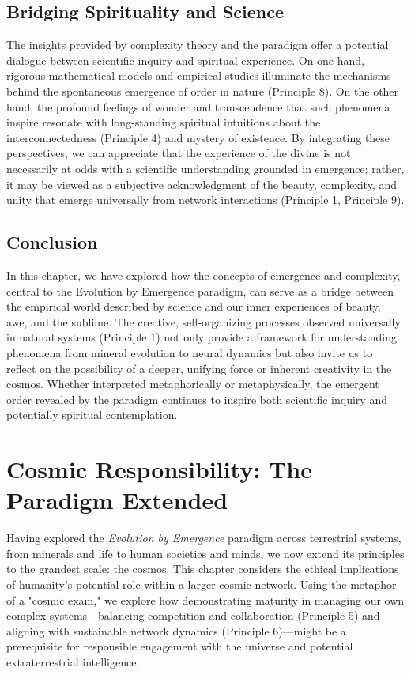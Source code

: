 \documentclass[12pt,openany]{book}
\let\cleardoublepage\clearpage %
\begin{document}
\section{Bridging Spirituality and Science}
The insights provided by complexity theory and the paradigm offer a potential dialogue between scientific inquiry and spiritual experience. On one hand, rigorous mathematical models and empirical studies illuminate the mechanisms behind the spontaneous emergence of order in nature (Principle 8). On the other hand, the profound feelings of wonder and transcendence that such phenomena inspire resonate with long-standing spiritual intuitions about the interconnectedness (Principle 4) and mystery of existence. By integrating these perspectives, we can appreciate that the experience of the divine is not necessarily at odds with a scientific understanding grounded in emergence; rather, it may be viewed as a subjective acknowledgment of the beauty, complexity, and unity that emerge universally from network interactions (Principle 1, Principle 9). %

\section{Conclusion}
In this chapter, we have explored how the concepts of emergence and complexity, central to the Evolution by Emergence paradigm, can serve as a bridge between the empirical world described by science and our inner experiences of beauty, awe, and the sublime. The creative, self-organizing processes observed universally in natural systems (Principle 1) not only provide a framework for understanding phenomena from mineral evolution to neural dynamics but also invite us to reflect on the possibility of a deeper, unifying force or inherent creativity in the cosmos. Whether interpreted metaphorically or metaphysically, the emergent order revealed by the paradigm continues to inspire both scientific inquiry and potentially spiritual contemplation. %
\cleardoublepage

\chapter{Cosmic Responsibility: The Paradigm Extended} %
\label{ch:CosmicResponsibility}

Having explored the \emph{Evolution by Emergence} paradigm across terrestrial systems, from minerals and life to human societies and minds, we now extend its principles to the grandest scale: the cosmos. This chapter considers the ethical implications of humanity's potential role within a larger cosmic network. Using the metaphor of a "cosmic exam," we explore how demonstrating maturity in managing our own complex systems—balancing competition and collaboration (Principle 5) and aligning with sustainable network dynamics (Principle 6)—might be a prerequisite for responsible engagement with the universe and potential extraterrestrial intelligence. %
\end{document}
